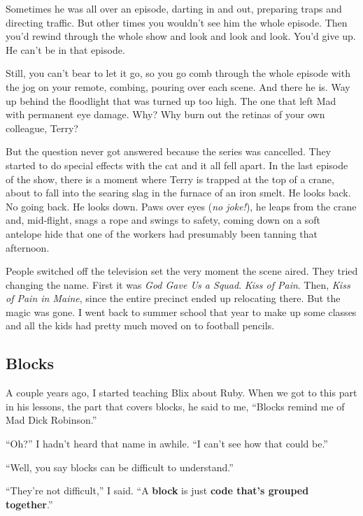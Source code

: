 \documentclass[12pt,twoside]{report}
\begin{document}
Sometimes he was all over an episode, darting in and out, preparing
traps and directing traffic. But other times you wouldn't see him the
whole episode.  Then you'd rewind through the whole show and look and
look and look.  You'd give up.  He can't be in that episode.

Still, you can't bear to let it go, so you go comb through the whole
episode with the jog on your remote, combing, pouring over each scene.
And there he is.  Way up behind the floodlight that was turned up too
high.  The one that left Mad with permanent eye damage.  Why?  Why
burn out the retinas of your own colleague, Terry?

But the question never got answered because the series was cancelled.
They started to do special effects with the cat and it all fell apart.
In the last episode of the show, there is a moment where Terry is
trapped at the top of a crane, about to fall into the searing slag in
the furnace of an iron smelt.  He looks back.  No going back.  He
looks down.  Paws over eyes ({\em no joke!}), he leaps from the crane
and, mid-flight, snags a rope and swings to safety, coming down on a
soft antelope hide that one of the workers had presumably been tanning
that afternoon.

People switched off the television set the very moment the scene
aired.  They tried changing the name. First it was {\em God Gave Us a
  Squad}.  {\em Kiss of Pain}.  Then, {\em Kiss of Pain in Maine},
since the entire precinct ended up relocating there.  But the magic
was gone.  I went back to summer school that year to make up some
classes and all the kids had pretty much moved on to football pencils.



\subsection{Blocks}



A couple years ago, I started teaching Blix about Ruby.  When we got
to this part in his lessons, the part that covers blocks, he said to
me, ``Blocks remind me of Mad Dick Robinson.''

``Oh?''  I hadn't heard that name in awhile.  ``I can't see how that
could be.''

``Well, you say blocks can be difficult to understand.''

``They're not difficult,'' I said.  ``A {\bf block} is just {\bf code
  that's grouped together}.''
\end{document}
